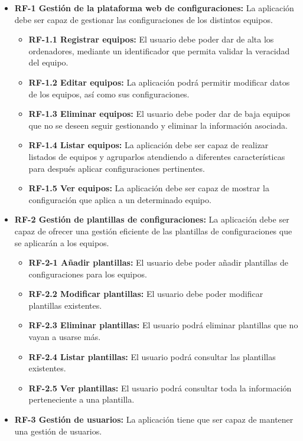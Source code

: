 \begin{itemize}
	\tightlist
	\item \textbf{RF-1 Gestión de la plataforma web de configuraciones:} La aplicación debe ser capaz de gestionar las configuraciones de los distintos equipos.
	\begin{itemize}
		\tightlist
		\item \textbf{RF-1.1 Registrar equipos:} El usuario debe poder dar de alta los ordenadores, mediante un identificador que permita validar la veracidad del equipo.
		\item \textbf{RF-1.2 Editar equipos:} La aplicación podrá permitir modificar datos de los equipos, así como sus configuraciones.
		\item \textbf{RF-1.3 Eliminar equipos:} El usuario debe poder dar de baja equipos que no se deseen seguir gestionando y eliminar la información asociada.
		\item \textbf{RF-1.4 Listar equipos:} La aplicación debe ser capaz de realizar listados de equipos y agruparlos atendiendo a diferentes características para después aplicar configuraciones pertinentes.
		\item \textbf{RF-1.5 Ver equipos:} La aplicación debe ser capaz de mostrar la configuración que aplica a un determinado equipo.
	\end{itemize}
	\item \textbf{RF-2 Gestión de plantillas de configuraciones:} La aplicación debe ser capaz de ofrecer una gestión eficiente de las plantillas de configuraciones que se aplicarán a los equipos.
	\begin{itemize}
		\tightlist
		\item \textbf{RF-2-1 Añadir plantillas:} El usuario debe poder añadir plantillas de configuraciones para los equipos.
		\item \textbf{RF-2.2 Modificar plantillas:} El usuario debe poder modificar plantillas existentes.
		\item \textbf{RF-2.3 Eliminar plantillas:} El usuario podrá eliminar plantillas que no vayan a usarse más.
		\item \textbf{RF-2.4 Listar plantillas:} El usuario podrá consultar las plantillas existentes.
		\item \textbf{RF-2.5 Ver plantillas:} El usuario podrá consultar toda la información perteneciente a una plantilla.
	\end{itemize}
	\item \textbf{RF-3 Gestión de usuarios:} La aplicación tiene que ser capaz de mantener una gestión de usuarios.

\end{itemize}
